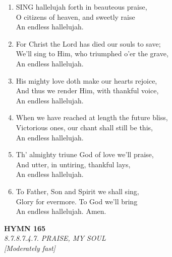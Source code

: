 \begin{enumerate}
    \item SING hallelujah forth in beauteous praise, \\
        O citizens of heaven, and sweetly raise \\
        An endless hallelujah.

    \item For Christ the Lord has died our souls to save; \\
        We'll sing to Him, who triumphed o'er the grave, \\
        An endless hallelujah.

    \item His mighty love doth make our hearts rejoice, \\
        And thus we render Him, with thankful voice, \\
        An endless hallelujah.

    \item When we have reached at length the future bliss, \\
        Victorious ones, our chant shall still be this, \\
        An endless hallelujah.

    \item Th' almighty triune God of love we'll praise, \\
        And utter, in untiring, thankful lays, \\
        An endless hallelujah.

    \item To Father, Son and Spirit we shall sing, \\
        Glory for evermore. To God we'll bring \\
        An endless hallelujah. Amen.

\end{enumerate}

\newpage
\begin{center}
    {\Large \textbf{HYMN 165}}
    \\
    \textit{8.7.8.7.4.7. PRAISE, MY SOUL}
    \\
    \textit{\small [Moderately fast]}
\end{center}
\vspace{1em}

